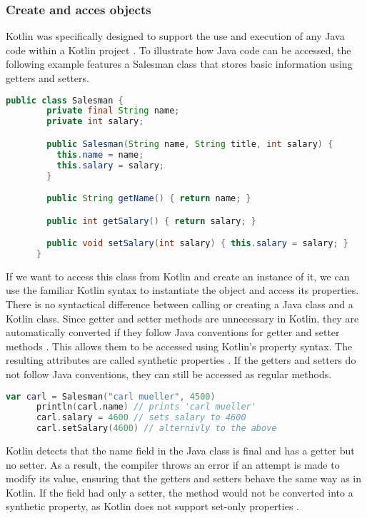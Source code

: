 \documentclass[a4paper, 11pt]{article}
\begin{document}
  \subsubsection{Create and acces objects}
    Kotlin was specifically designed to support the use and execution of any Java code within a Kotlin project \cite{interop}. To illustrate how Java code can be accessed, the following example features a Salesman class that stores basic information using getters and setters.
    \begin{lstlisting}[language=Java,title={Example java class}]
      public class Salesman {
        private final String name;
        private int salary;

        public Salesman(String name, String title, int salary) {
          this.name = name;
          this.salary = salary;
        }

        public String getName() { return name; }

        public int getSalary() { return salary; }

        public void setSalary(int salary) { this.salary = salary; }
      }
    \end{lstlisting}
    If we want to access this class from Kotlin and create an instance of it, we can use the familiar Kotlin syntax \cite{interop} to instantiate the object and access its properties. There is no syntactical difference between calling or creating a Java class and a Kotlin class. Since getter and setter methods are unnecessary in Kotlin, they are automatically converted if they follow Java conventions for getter and setter methods \cite{interop-getter-setter}. This allows them to be accessed using Kotlin's property syntax. The resulting attributes are called synthetic properties \cite{interop-synthetic-property}. If the getters and setters do not follow Java conventions, they can still be accessed as regular methods.
    \begin{lstlisting}[language=Kotlin, title={Access the Salesman class in Kotlin}]
      var carl = Salesman("carl mueller", 4500)
      println(carl.name) // prints 'carl mueller'
      carl.salary = 4600 // sets salary to 4600
      carl.setSalary(4600) // alternivly to the above
    \end{lstlisting}
    Kotlin detects that the name field in the Java class is final and has a getter but no setter. As a result, the compiler throws an error if an attempt is made to modify its value, ensuring that the getters and setters behave the same way as in Kotlin. If the field had only a setter, the method would not be converted into a synthetic property, as Kotlin does not support set-only properties \cite{interop-synthetic-property}. %
\end{document}

